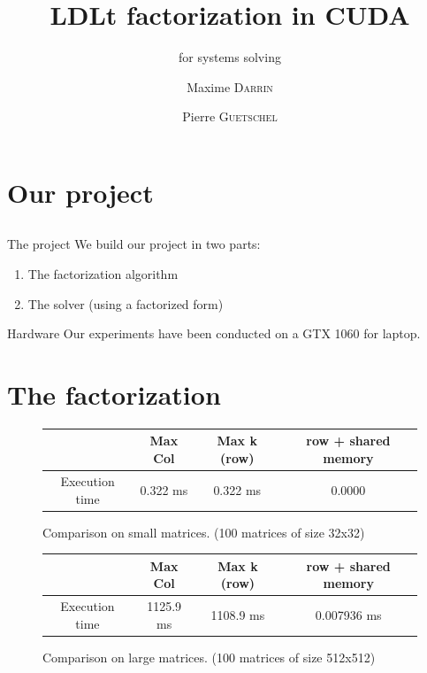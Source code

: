 \documentclass[compress,xcolor=table]{beamer}
\title{LDLt factorization in CUDA}
\subtitle{for systems solving} %
\date{\formatdate{22}{03}{2020}}
\author{Maxime \textsc{Darrin} \and Pierre \textsc{Guetschel}}
\institute{M2A - Sorbonne Université} %
\begin{document}
\begin{frame}[plain]
	\titlepage
\end{frame}

\section{Our project} \subsection{}

\begin{frame}
	
	\begin{block}{The project}
		We build our project in two parts:
		\begin{enumerate}
			\item The factorization algorithm
			\item The solver (using a factorized form)
		\end{enumerate}
	\end{block}

	\begin{exampleblock}{Hardware}
		Our experiments have been conducted on a GTX 1060 for laptop.
	\end{exampleblock}

\end{frame}

\section{The factorization}

\begin{frame}{}
	
	\begin{figure}
		\begin{tabular}{c|c|c|c}
			& Max Col & Max k (row) & row + shared memory
			\\
			\hline
			Execution time & 0.322 ms &0.322 ms & 0.0000 \\
		\end{tabular}
	
	\caption{Comparison on small matrices. (100 matrices of size 32x32)}
	\end{figure}

\end{frame}

\begin{frame}{}
	
	\begin{figure}
		\begin{tabular}{c|c|c|c}
			& Max Col & Max k (row) & row + shared memory
			\\
			\hline
			Execution time &  1125.9 ms & 1108.9 ms &  0.007936 ms \\
		\end{tabular}
		
		\caption{Comparison on large matrices. (100 matrices of size 512x512)}
	\end{figure}
	
\end{frame}
\end{document}
